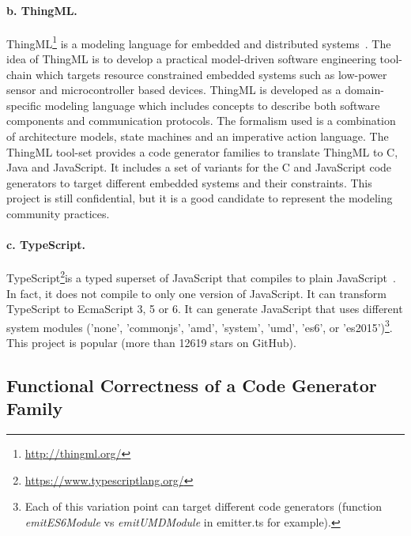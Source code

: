 \paragraph{b. ThingML.} ThingML\footnote{\url{http://thingml.org/}} is a modeling language for embedded and distributed systems~\cite{fleurey2011mde}. The idea of ThingML is to develop a practical model-driven software engineering tool-chain which targets resource constrained embedded systems such as low-power sensor and microcontroller based devices. ThingML is developed as a domain-specific modeling language which includes concepts to describe both software components and communication protocols. The formalism used is a combination of architecture models, state machines and an imperative action language. The ThingML tool-set provides a  code generator families  to translate ThingML to C, Java and JavaScript. It includes a set of variants for the C and JavaScript code generators to target different embedded systems and their constraints. 
This project is still confidential, but it is a good candidate to represent the modeling community practices.
 
\paragraph{c. TypeScript.} TypeScript\footnote{\url{https://www.typescriptlang.org/}}is a typed superset of JavaScript that compiles to plain JavaScript~\cite{rastogi2015safe}. In fact, it does not compile to only one version of JavaScript. It can transform TypeScript to EcmaScript 3, 5 or 6. It can generate JavaScript that uses different system modules ('none', 'commonjs', 'amd', 'system', 'umd', 'es6', or 'es2015')\footnote{Each of this variation point can target different code generators (function \textit{emitES6Module} vs \textit{emitUMDModule} in emitter.ts for example).}. 
This project is popular (more than \num{12619} stars on GitHub).


\subsection{Functional Correctness of a Code Generator Family}

